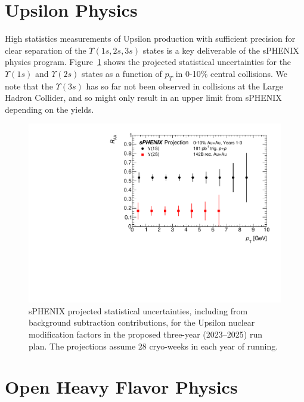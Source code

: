 \section{Upsilon Physics}
\label{sec:upsilon}

High statistics measurements of Upsilon production with sufficient
precision for clear separation of the $\Upsilon(1s,2s,3s)$ states is a
key deliverable of the sPHENIX physics program.
Figure~\ref{fig:upsilon3years} shows the projected statistical
uncertainties for the $\Upsilon(1s)$ and $\Upsilon(2s)$ states as a
function of $p_{T}$ in 0-10\% central \auau collisions.  We note that
the $\Upsilon(3s)$ has so far not been observed in \pbpb collisions at
the Large Hadron Collider, and so might only result in an upper limit
from sPHENIX depending on the yields.


\begin{figure}[h]
    \centering
    \includegraphics[width=0.55\linewidth]{figs/upsilon_RAA_1.pdf}
    \caption{sPHENIX projected statistical uncertainties, including
      from background subtraction contributions, for the Upsilon
      nuclear modification factors in the proposed three-year
      (2023--2025) run plan.   The projections assume 28
      cryo-weeks in each year of running. 
      \label{fig:upsilon3years}}
\end{figure}

\section{Open Heavy Flavor Physics}
\label{sec:HF}

